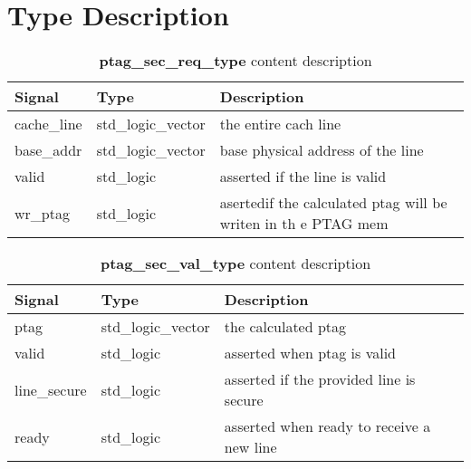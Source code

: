 \chapter{Type Description}
\label{ap:signals}

\begin{table}[H]
\centering
\label{table:psrtype}
\begin{tabular}{l l p{55mm}}
\textbf{Signal} & \textbf{Type}      & \textbf{Description}                                         	\\ \hline \hline
cache\_line 	& std\_logic\_vector & the entire cach line                                        	\\ \hline
base\_addr  	& std\_logic\_vector & base physical address of the line                            	\\ \hline
valid       	& std\_logic         & asserted if the line is valid                                	\\ \hline
wr\_ptag    	& std\_logic         & asertedif the calculated ptag will be  writen in th e PTAG mem    \\  \hline
\end{tabular}                                                                                                                                   
\caption{\textbf{ptag\_sec\_req\_type} content description}                                                                                              
\end{table}                                                                                                                                     


\begin{table}[H]
\centering
\label{table:psvtype}
\begin{tabular}{l l p{55mm}}
\textbf{Signal} & \textbf{Type}      & \textbf{Description}                        \\ \hline \hline
ptag 		& std\_logic\_vector & the calculated ptag                         \\ \hline
valid 		& std\_logic         & asserted when  ptag is valid                \\ \hline
line\_secure 	& std\_logic         & asserted if the provided line is secure     \\ \hline
ready 		& std\_logic         & asserted when ready to receive a new line   \\  \hline
\end{tabular}                                                                                                                                   
\caption{\textbf{ptag\_sec\_val\_type} content description}                                                                                              
\end{table}    




